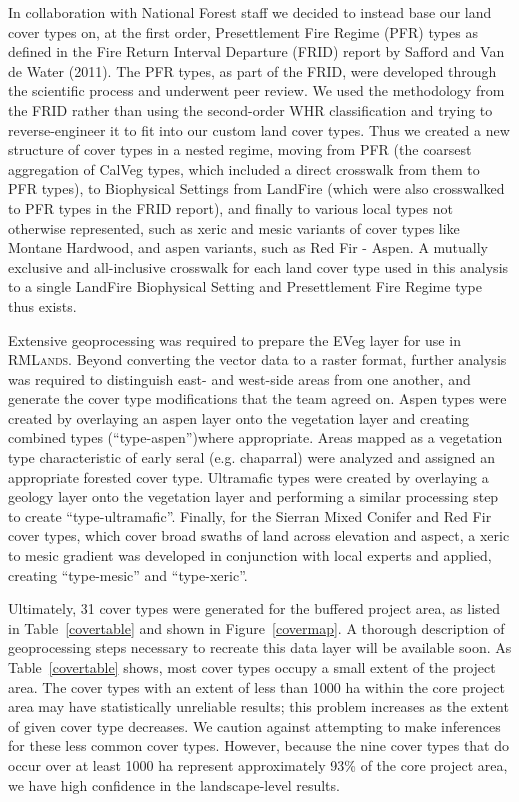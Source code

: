 %
In collaboration with National Forest staff we decided to instead base our land cover types on, at the first order, Presettlement Fire Regime (PFR) types as defined in the Fire Return Interval Departure (FRID) report by Safford and Van de Water (2011). The PFR types, as part of the FRID, were developed through the scientific process and underwent peer review. We used the methodology from the FRID rather than using the second-order WHR classification and trying to reverse-engineer it to fit into our custom land cover types. Thus we created a new structure of cover types in a nested regime, moving from PFR (the coarsest aggregation of CalVeg types, which included a direct crosswalk from them to PFR types), to Biophysical Settings from LandFire (which were also crosswalked to PFR types in the FRID report), and finally to various local types not otherwise represented, such as xeric and mesic variants of cover types like Montane Hardwood, and aspen variants, such as Red Fir - Aspen. A mutually exclusive and all-inclusive crosswalk for each land cover type used in this analysis to a single LandFire Biophysical Setting and Presettlement Fire Regime type thus exists.

Extensive geoprocessing was required to prepare the EVeg layer for use in \textsc{RMLands}. Beyond converting the vector data to a raster format, further analysis was required to distinguish east- and west-side areas from one another, and generate the cover type modifications that the team agreed on. Aspen types were created by overlaying an aspen layer onto the vegetation layer and creating combined types (``type-aspen'')where appropriate. Areas mapped as a vegetation type characteristic of early seral (e.g. chaparral) were analyzed and assigned an appropriate forested cover type. Ultramafic types were created by overlaying a geology layer onto the vegetation layer and performing a similar processing step to create ``type-ultramafic''. Finally, for the Sierran Mixed Conifer and Red Fir cover types, which cover broad swaths of land across elevation and aspect, a xeric to mesic gradient was developed in conjunction with local experts and applied, creating ``type-mesic'' and ``type-xeric''. 

Ultimately, 31 cover types were generated for the buffered project area, as listed in Table~\ref{covertable} and shown in Figure~\ref{covermap}. A thorough description of geoprocessing steps necessary to recreate this data layer will be available soon. As Table~\ref{covertable} shows, most cover types occupy a small extent of the project area. The cover types with an extent of less than 1000 ha within the core project area may have statistically unreliable results; this problem increases as the extent of given cover type decreases. We caution against attempting to make inferences for these less common cover types. However, because the nine cover types that do occur over at least 1000 ha represent approximately 93\% of the core project area, we have high confidence in the landscape-level results.

